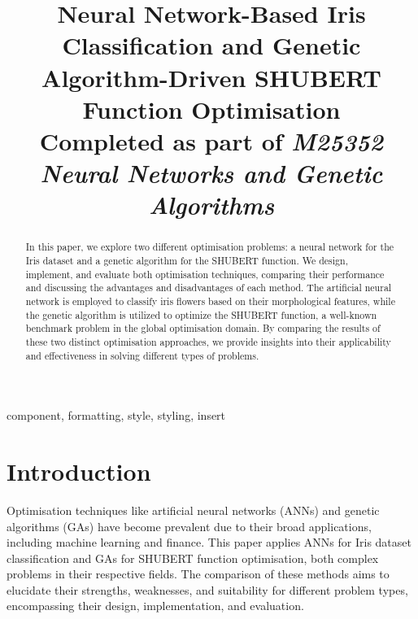 \documentclass[conference]{inc/IEEEtran}
\begin{document}
\title{Neural Network-Based Iris Classification and Genetic Algorithm-Driven SHUBERT Function Optimisation \\
{\footnotesize Completed as part of \textit{M25352 Neural Networks and Genetic Algorithms}}
}


\author{
    \and
}

\maketitle

\begin{abstract}
    In this paper, we explore two different optimisation problems: a neural network for the Iris dataset and a genetic algorithm for the SHUBERT function. We design, implement, and evaluate both optimisation techniques, comparing their performance and discussing the advantages and disadvantages of each method. The artificial neural network is employed to classify iris flowers based on their morphological features, while the genetic algorithm is utilized to optimize the SHUBERT function, a well-known benchmark problem in the global optimisation domain. By comparing the results of these two distinct optimisation approaches, we provide insights into their applicability and effectiveness in solving different types of problems.
\end{abstract}

\begin{IEEEkeywords}
    component, formatting, style, styling, insert
\end{IEEEkeywords}

\section{Introduction}

Optimisation techniques like artificial neural networks (ANNs) and genetic algorithms (GAs) have become prevalent due to their broad applications, including machine learning and finance. This paper applies ANNs for Iris dataset classification and GAs for SHUBERT function optimisation, both complex problems in their respective fields. The comparison of these methods aims to elucidate their strengths, weaknesses, and suitability for different problem types, encompassing their design, implementation, and evaluation.
\end{document}
